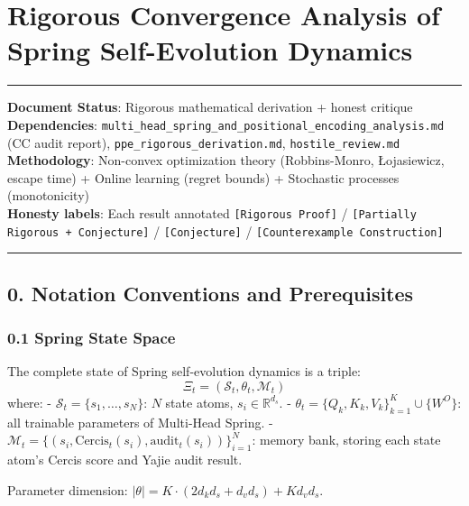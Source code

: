 \documentclass[
  12pt,
]{article}
\author{SCX}
\date{2026}
\begin{document}
\section{Rigorous Convergence Analysis of Spring Self-Evolution Dynamics}\label{spring-convergence-analysis}

\begin{center}\rule{0.5\linewidth}{0.5pt}\end{center}

\textbf{Document Status}: Rigorous mathematical derivation + honest critique\\
\textbf{Dependencies}: \texttt{multi\_head\_spring\_and\_positional\_encoding\_analysis.md} (CC audit report), \texttt{ppe\_rigorous\_derivation.md}, \texttt{hostile\_review.md}\\
\textbf{Methodology}: Non-convex optimization theory (Robbins-Monro, \L ojasiewicz, escape time) + Online learning (regret bounds) + Stochastic processes (monotonicity)\\
\textbf{Honesty labels}: Each result annotated \texttt{[Rigorous Proof]} / \texttt{[Partially Rigorous + Conjecture]} / \texttt{[Conjecture]} / \texttt{[Counterexample Construction]}

\begin{center}\rule{0.5\linewidth}{0.5pt}\end{center}

\subsection{0. Notation Conventions and Prerequisites}\label{notation-conventions}

\subsubsection{0.1 Spring State Space}\label{spring-state-space}

The complete state of Spring self-evolution dynamics is a triple:
\[\boxed{\Xi_t = (\mathcal{S}_t, \theta_t, \mathcal{M}_t)}\]
where:
- $\mathcal{S}_t = \{s_1, \ldots, s_N\}$: $N$ state atoms, $s_i \in \mathbb{R}^{d_s}$.
- $\theta_t = \{Q_k, K_k, V_k\}_{k=1}^{K} \cup \{W^O\}$: all trainable parameters of Multi-Head Spring.
- $\mathcal{M}_t = \{(s_i, \text{Cercis}_t(s_i), \text{audit}_t(s_i))\}_{i=1}^{N}$: memory bank, storing each state atom's Cercis score and Yajie audit result.

Parameter dimension: $|\theta| = K \cdot (2d_k d_s + d_v d_s) + K d_v d_s$.
\end{document}
